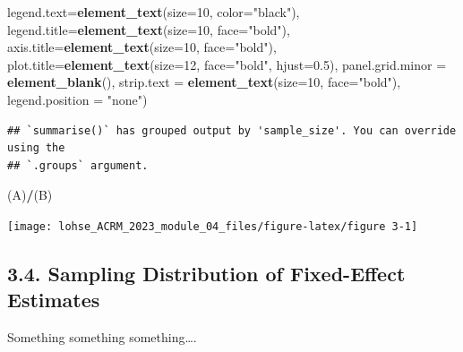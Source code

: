 \documentclass[
]{article}
\newenvironment{Shaded}{\begin{snugshade}}{\end{snugshade}}
\newcommand{\AttributeTok}[1]{\textcolor[rgb]{0.13,0.29,0.53}{#1}}
\newcommand{\DecValTok}[1]{\textcolor[rgb]{0.00,0.00,0.81}{#1}}
\newcommand{\FloatTok}[1]{\textcolor[rgb]{0.00,0.00,0.81}{#1}}
\newcommand{\FunctionTok}[1]{\textcolor[rgb]{0.13,0.29,0.53}{\textbf{#1}}}
\newcommand{\NormalTok}[1]{#1}
\newcommand{\SpecialCharTok}[1]{\textcolor[rgb]{0.81,0.36,0.00}{\textbf{#1}}}
\newcommand{\StringTok}[1]{\textcolor[rgb]{0.31,0.60,0.02}{#1}}
\begin{document}
\begin{Shaded}
\begin{Highlighting}[]
        \AttributeTok{legend.text=}\FunctionTok{element\_text}\NormalTok{(}\AttributeTok{size=}\DecValTok{10}\NormalTok{, }\AttributeTok{color=}\StringTok{"black"}\NormalTok{),}
        \AttributeTok{legend.title=}\FunctionTok{element\_text}\NormalTok{(}\AttributeTok{size=}\DecValTok{10}\NormalTok{, }\AttributeTok{face=}\StringTok{"bold"}\NormalTok{),}
        \AttributeTok{axis.title=}\FunctionTok{element\_text}\NormalTok{(}\AttributeTok{size=}\DecValTok{10}\NormalTok{, }\AttributeTok{face=}\StringTok{"bold"}\NormalTok{),}
        \AttributeTok{plot.title=}\FunctionTok{element\_text}\NormalTok{(}\AttributeTok{size=}\DecValTok{12}\NormalTok{, }\AttributeTok{face=}\StringTok{"bold"}\NormalTok{, }\AttributeTok{hjust=}\FloatTok{0.5}\NormalTok{),}
        \AttributeTok{panel.grid.minor =} \FunctionTok{element\_blank}\NormalTok{(),}
        \AttributeTok{strip.text =} \FunctionTok{element\_text}\NormalTok{(}\AttributeTok{size=}\DecValTok{10}\NormalTok{, }\AttributeTok{face=}\StringTok{"bold"}\NormalTok{),}
        \AttributeTok{legend.position =} \StringTok{"none"}\NormalTok{)}
\end{Highlighting}
\end{Shaded}

\begin{verbatim}
## `summarise()` has grouped output by 'sample_size'. You can override using the
## `.groups` argument.
\end{verbatim}

\begin{Shaded}
\begin{Highlighting}[]
\NormalTok{(A)}\SpecialCharTok{/}\NormalTok{(B)}
\end{Highlighting}
\end{Shaded}

\begin{center}\texttt{[image: lohse\_ACRM\_2023\_module\_04\_files/figure-latex/figure 3-1]} \end{center}

\hypertarget{sampling-distribution-of-fixed-effect-estimates}{%
\subsection{3.4. Sampling Distribution of Fixed-Effect
Estimates}\label{sampling-distribution-of-fixed-effect-estimates}}

Something something something\ldots.
\end{document}
